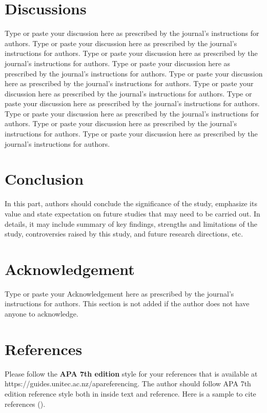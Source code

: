\documentclass[12pt,a4paper,twoside]{article}
\begin{document}
\section*{Discussions}
Type or paste your discussion here as prescribed by the journal’s instructions for authors. Type or paste your discussion here as prescribed by the journal’s instructions for authors.	 Type or paste your discussion here as prescribed by the journal’s instructions for authors. Type or paste your discussion here as prescribed by the journal’s instructions for authors. Type or paste your discussion here as prescribed by the journal’s instructions for authors.
Type or paste your discussion here as prescribed by the journal’s instructions for authors. Type or paste your discussion here as prescribed by the journal’s instructions for authors.	 Type or paste your discussion here as prescribed by the journal’s instructions for authors. Type or paste your discussion here as prescribed by the journal’s instructions for authors. Type or paste your discussion here as prescribed by the journal’s instructions for authors.
\section*{Conclusion}
In this part, authors should conclude the significance of the study, emphasize its value and state expectation on future studies that may need to be carried out. In details, it may include summary of key findings, strengths and limitations of the study, controversies raised by this study, and future research directions, etc.
\section*{Acknowledgement}
Type or paste your Acknowledgement here as prescribed by the journal’s instructions for authors. This section is not added if the author does not have anyone to acknowledge.

\section*{References}
Please follow the \textbf{APA 7th edition} style for your references that is available at https://guides.unitec.ac.nz/apareferencing. The author should follow APA 7th edition reference style both in inside text and reference. Here is a sample to cite references (\cite{atanu2022}).

\printbibliography
\end{document}
